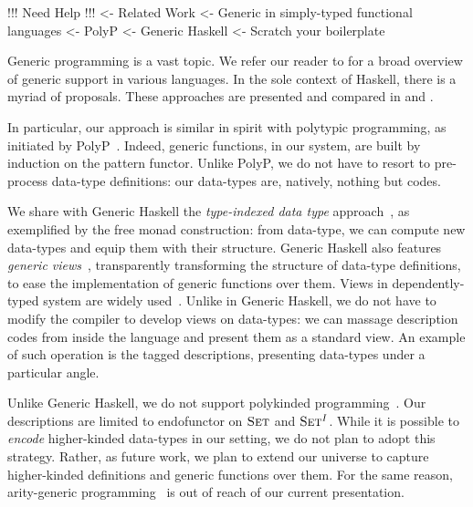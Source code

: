 \begin{wstructure}
!!! Need Help !!!
<- Related Work
    <- Generic in simply-typed functional languages
        <- PolyP \cite{jansson:polyp}
        <- Generic Haskell \cite{hinze:generic-haskell}
        <- Scratch your boilerplate \cite{spj:syb}
\end{wstructure}

Generic programming is a vast topic. We refer our reader to 
\citet{garcia:generic-comparative-study} for a broad overview of
generic support in various languages. In the sole context of Haskell,
there is a myriad of proposals. These approaches are presented and
compared in \citet{hinze:generic-approach-comparative} and
\citet{rodriguez:generic-libs-comparative}.

In particular, our approach is similar in spirit with polytypic
programming, as initiated by PolyP~\cite{jansson:polyp}. Indeed,
generic functions, in our system, are built by induction on the
pattern functor. Unlike PolyP, we do not have to resort to pre-process
data-type definitions: our data-types are, natively, nothing but
codes.

We share with Generic Haskell the \emph{type-indexed data type}
approach~\cite{hinze:generic-haskell}, as exemplified by the free
monad construction: from data-type, we can compute new data-types and
equip them with their structure. Generic Haskell also features
\emph{generic views}~\cite{holdermans:generic-view}, transparently
transforming the structure of data-type definitions, to ease the
implementation of generic functions over them. Views in
dependently-typed system are widely
used~\cite{mcbride.mckinna:view-from-the-left}. Unlike in Generic
Haskell, we do not have to modify the compiler to develop views on
data-types: we can massage description codes from inside the language
and present them as a standard view. An example of such operation is
the tagged descriptions, presenting data-types under a particular
angle.

Unlike Generic Haskell, we do not support polykinded
programming~\cite{hinze:polytypic-polykinded}. Our descriptions are
limited to endofunctor on $\Set$ and $\Set^I$. While it is possible to
\emph{encode} higher-kinded data-types in our setting, we do not plan
to adopt this strategy. Rather, as future work, we plan to extend our
universe to capture higher-kinded definitions and generic functions
over them. For the same reason, arity-generic
programming~\cite{weirich:arity-generic} is out of reach of our
current presentation.

